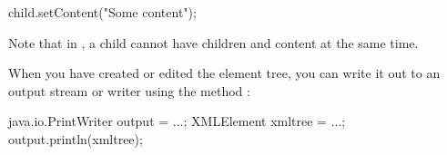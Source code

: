 \begin{example}
child.setContent("Some content");
\end{example}

Note that in , a child cannot have children and
 content at the same time.

When you have created or edited the  element tree, you can write it
out to an output stream or writer using the method :

\begin{example}
java.io.PrintWriter output = ...;
XMLElement xmltree = ...;
output.println(xmltree);
\end{example}
